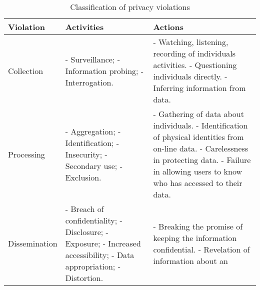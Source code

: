 \begin{table*}[ht]
\centering
\caption{Classification of privacy violations}
\def\arraystretch{2.0}
\begin{tabular}{ | p{6em} || p{6em} || p{14em} |}
  \hline
   \textbf{Violation} & \textbf{Activities} & \textbf{Actions} \\
  \hline
  \hline
Collection	
    & - Surveillance; \newline
      - Information \newline
      probing; \newline
      - Interrogation.
    & - Watching, listening, recording of \newline 
        individuals activities. \newline
      - Questioning individuals directly. \newline
      - Inferring information from data.\\
  \hline
Processing 			
    & - Aggregation; \newline
      - Identification; \newline
      - Insecurity; \newline
      - Secondary \newline
        use; \newline
      - Exclusion.						
    & - Gathering of data about individuals. \newline
      - Identification of physical identities \newline
        from on-line data. \newline
      - Carelessness in protecting data. \newline
      - Failure in allowing users to know \newline
        who has accessed to their data. \\
  \hline
Dissemination 			
    & - Breach of \newline
        confidentiality; \newline
      - Disclosure; \newline
      - Exposure; \newline 
      - Increased \newline
        accessibility; \newline
      - Data appropriation; \newline
      - Distortion.
    & - Breaking the promise of keeping the information confidential. \newline
      - Revelation of information about an \newline

\end{tabular}
\end{table*}
